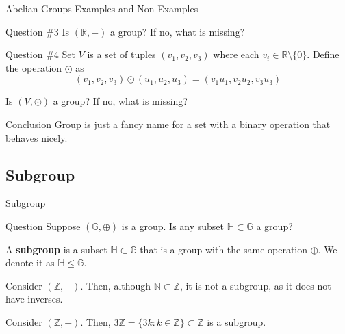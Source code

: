 \documentclass{beamer}
\begin{document}
    \begin{frame}{Abelian Groups Examples and Non-Examples}
      \begin{alertblock}{Question \#3}
        Is $(\mathbb{R}, -)$ a group? If no, what is missing?
      \end{alertblock}
      \begin{alertblock}{Question \#4}
          Set $V$ is a set of tuples $(v_1,v_2,v_3)$ where each $v_i \in \mathbb{R} \setminus \{0\}$. Define the operation $\odot$ as
          \begin{equation*}
              (v_1,v_2,v_3) \odot (u_1,u_2,u_3) = (v_1u_1, v_2u_2, v_3u_3)
          \end{equation*}

          Is $(V, \odot)$ a group? If no, what is missing?
      \end{alertblock}
      \begin{block}{Conclusion}
        Group is just a fancy name for a set with a binary operation that behaves nicely.
      \end{block}
    \end{frame}

    \subsection{Subgroup}
    \begin{frame}{Subgroup}

      \begin{alertblock}{Question}
          Suppose $(\mathbb{G}, \oplus)$ is a group. Is any subset $\mathbb{H} \subset \mathbb{G}$ a group?
      \end{alertblock}

      \begin{definition}
          A \textbf{subgroup} is a subset $\mathbb{H} \subset \mathbb{G}$ that is a group with the same operation $\oplus$. We denote it as $\mathbb{H} \leq \mathbb{G}$.
      \end{definition}

      \begin{example}
          Consider $(\mathbb{Z}, +)$. Then, although $\mathbb{N} \subset \mathbb{Z}$, it is not a subgroup, as it does not have inverses.
      \end{example}

      \begin{example}
          Consider $(\mathbb{Z}, +)$. Then, $3\mathbb{Z} = \{3k: k \in \mathbb{Z}\} \subset \mathbb{Z}$ is a subgroup.
      \end{example}
  \end{frame}
\end{document}
